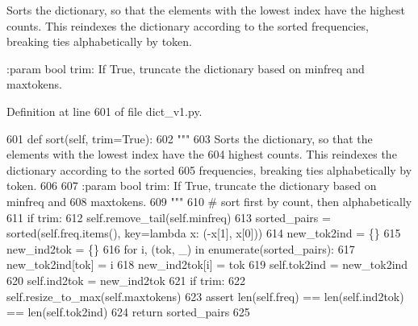 \begin{DoxyVerb}Sorts the dictionary, so that the elements with the lowest index have the
highest counts. This reindexes the dictionary according to the sorted
frequencies, breaking ties alphabetically by token.

:param bool trim: If True, truncate the dictionary based on minfreq and
    maxtokens.
\end{DoxyVerb}
 

Definition at line 601 of file dict\+\_\+v1.\+py.


\begin{DoxyCode}
601     \textcolor{keyword}{def }sort(self, trim=True):
602         \textcolor{stringliteral}{"""}
603 \textcolor{stringliteral}{        Sorts the dictionary, so that the elements with the lowest index have the}
604 \textcolor{stringliteral}{        highest counts. This reindexes the dictionary according to the sorted}
605 \textcolor{stringliteral}{        frequencies, breaking ties alphabetically by token.}
606 \textcolor{stringliteral}{}
607 \textcolor{stringliteral}{        :param bool trim: If True, truncate the dictionary based on minfreq and}
608 \textcolor{stringliteral}{            maxtokens.}
609 \textcolor{stringliteral}{        """}
610         \textcolor{comment}{# sort first by count, then alphabetically}
611         \textcolor{keywordflow}{if} trim:
612             self.remove\_tail(self.minfreq)
613         sorted\_pairs = sorted(self.freq.items(), key=\textcolor{keyword}{lambda} x: (-x[1], x[0]))
614         new\_tok2ind = \{\}
615         new\_ind2tok = \{\}
616         \textcolor{keywordflow}{for} i, (tok, \_) \textcolor{keywordflow}{in} enumerate(sorted\_pairs):
617             new\_tok2ind[tok] = i
618             new\_ind2tok[i] = tok
619         self.tok2ind = new\_tok2ind
620         self.ind2tok = new\_ind2tok
621         \textcolor{keywordflow}{if} trim:
622             self.resize\_to\_max(self.maxtokens)
623         \textcolor{keyword}{assert} len(self.freq) == len(self.ind2tok) == len(self.tok2ind)
624         \textcolor{keywordflow}{return} sorted\_pairs
625 
\end{DoxyCode}
\mbox{\label{classparlai_1_1agents_1_1legacy__agents_1_1seq2seq_1_1dict__v1_1_1DictionaryAgent_a995253a4769e95991e0ba9174a37f6aa}} 
